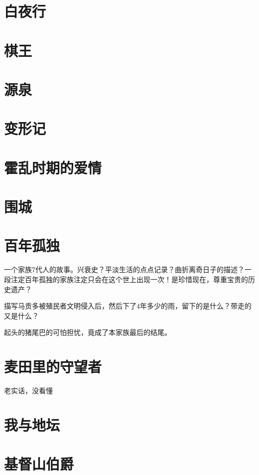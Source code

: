 \documentclass[UTF8,a4paper,12pt]{ctexbook}
\begin{document}
	\section{白夜行}
	
	\section{棋王}
	
	\section{源泉}
	
	\section{变形记}
	
	\section{霍乱时期的爱情}
	
	\section{围城}
	
	\section{百年孤独}
		一个家族7代人的故事。兴衰史？平淡生活的点点记录？曲折离奇日子的描述？一段注定百年孤独的家族注定只会在这个世上出现一次！是珍惜现在，尊重宝贵的历史遗产？
		
		描写马贡多被殖民者文明侵入后，然后下了4年多少的雨，留下的是什么？带走的又是什么？
		
		起头的猪尾巴的可怕担忧，竟成了本家族最后的结尾。
		
	\section{麦田里的守望者}
		老实话，没看懂
		
	\section{我与地坛}
	
	\section{基督山伯爵}
	
\end{document}
